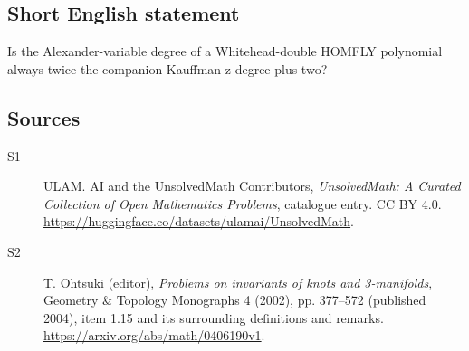 \documentclass[11pt]{article}
\begin{document}
\subsection{Short English statement}
Is the Alexander-variable degree of a Whitehead-double HOMFLY polynomial always twice the companion Kauffman z-degree plus two?
\subsection{Sources}
\begin{description}
\item[\hypertarget{source:statement:1}{S1}] ULAM. AI and the UnsolvedMath Contributors, \emph{UnsolvedMath: A Curated Collection of Open Mathematics Problems}, catalogue entry. CC BY 4.0. \url{https://huggingface.co/datasets/ulamai/UnsolvedMath}.
\item[\hypertarget{source:statement:2}{S2}] T. Ohtsuki (editor), \emph{Problems on invariants of knots and 3-manifolds}, Geometry \& Topology Monographs 4 (2002), pp. 377--572 (published 2004), item 1.15 and its surrounding definitions and remarks. \url{https://arxiv.org/abs/math/0406190v1}.
\end{description}
\label{end:statement}
\end{document}
